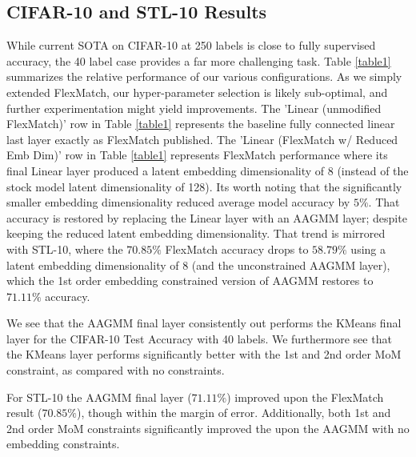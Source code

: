 \documentclass[10pt,twocolumn,letterpaper]{article}
\begin{document}
\subsection{CIFAR-10 and STL-10 Results}

While current SOTA on CIFAR-10 at 250 labels is close to fully supervised accuracy, the 40 label case provides a far more challenging task. 
Table \ref{table1} summarizes the relative performance of our various configurations.
As we simply extended FlexMatch, our hyper-parameter selection is likely sub-optimal, and further experimentation might yield improvements.
The 'Linear (unmodified FlexMatch)' row in Table \ref{table1} represents the baseline fully connected linear last layer exactly as FlexMatch published. 
The 'Linear (FlexMatch w/ Reduced Emb Dim)' row in Table \ref{table1} represents FlexMatch performance where its final Linear layer produced a latent embedding dimensionality of 8 (instead of the stock model latent dimensionality of 128).
Its worth noting that the significantly smaller embedding dimensionality reduced average model accuracy by $5\%$.
That accuracy is restored by replacing the Linear layer with an AAGMM layer; despite keeping the reduced latent embedding dimensionality.
That trend is mirrored with STL-10, where the $70.85\%$ FlexMatch accuracy drops to $58.79\%$ using a latent embedding dimensionality of 8 (and the unconstrained AAGMM layer), which the 1st order embedding constrained version of AAGMM restores to $71.11\%$ accuracy.


We see that the AAGMM final layer consistently out performs the KMeans final layer for the CIFAR-10 Test Accuracy with 40 labels.  
We furthermore see that the KMeans layer performs significantly better with the 1st and 2nd order MoM constraint, as compared with no constraints.  

For STL-10 the AAGMM final layer ($71.11\%$) improved upon the FlexMatch \cite{zhang2021flexmatch} result ($70.85\%$), though within the margin of error.
Additionally, both 1st and 2nd order MoM constraints significantly improved the upon the AAGMM with no embedding constraints. 
\end{document}

